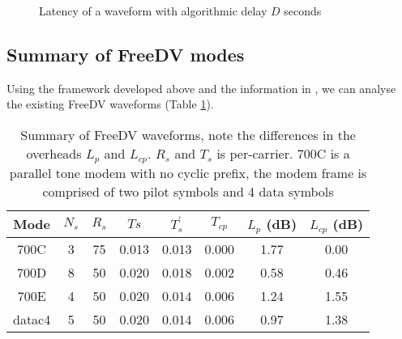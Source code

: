 \documentclass{article}
\begin{document}
\begin{figure}[h]
\caption{Latency of a waveform with algorithmic delay $D$ seconds}
\vspace{5mm}
\label{fig:latency}
\centering
{}
\end{figure}

\subsection{Summary of FreeDV modes}

Using the framework developed above and the information in \cite{codec2_waveform_spreadsheet}, we can analyse the existing FreeDV waveforms (Table \ref{tab:freedv_waveforms}).

\begin{table}[h]
\centering
\begin{tabular}{c c c c c c c c}
 \hline
 Mode & $N_s$ & $R_s$ & $Ts$ & $T^\prime_s$ & $T_{cp}$ & ${L_p}$ (dB) & $L_{cp}$ (dB)  \\
 \hline
 700C & 3 & 75 & 0.013 & 0.013 & 0.000 & 1.77 & 0.00 \\
 700D & 8 & 50 & 0.020 & 0.018 & 0.002 & 0.58 & 0.46 \\
 700E & 4 & 50 & 0.020 & 0.014 & 0.006 & 1.24 & 1.55 \\
 datac4 & 5 & 50 & 0.020 & 0.014 & 0.006 & 0.97 & 1.38 \\
 \hline
\end{tabular}
\caption{Summary of FreeDV waveforms, note the differences in the overheads $L_p$ and $L_{cp}$. $R_s$ and $T_s$ is per-carrier. 700C is a parallel tone modem with no cyclic prefix, the modem frame is comprised of two pilot symbols and 4 data symbols}
\label{tab:freedv_waveforms}
\end{table}
\end{document}
